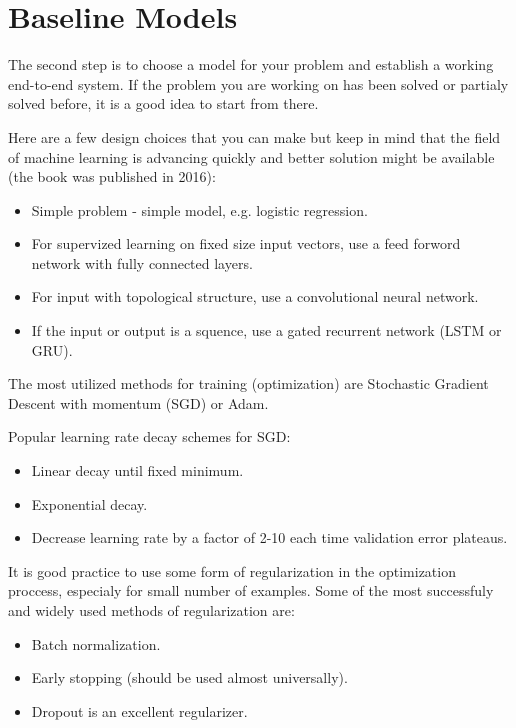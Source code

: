 \documentclass{tufte-handout}
\begin{document}
\section{Baseline Models}\label{sec:baseline-model}
The second step is to choose a model for your problem and establish a working
end-to-end system. If the problem you are working on has been solved or partialy
solved before, it is a good idea to start from there.

Here are a few design choices that you can make but keep in mind that the field of
machine learning is advancing quickly and better solution might be available
(the book was published in 2016):
\begin{itemize}
    \item Simple problem - simple model, e.g. logistic regression.
    \item For supervized learning on fixed size input vectors, use a feed forword
        network with fully connected layers.
    \item For input with topological structure, use a convolutional neural network.
    \item If the input or output is a squence, use a gated recurrent network 
        (LSTM or GRU).
\end{itemize}

The most utilized methods for training (optimization) are Stochastic Gradient
Descent with momentum (SGD) or Adam.

Popular learning rate decay schemes for SGD:
\begin{itemize}
    \item Linear decay until fixed minimum.
    \item Exponential decay.
    \item Decrease learning rate by a factor of 2-10 each time
         validation error plateaus.
\end{itemize}

It is good practice to use some form of regularization in the optimization proccess,
especialy for small number of examples.
Some of the most successfuly and widely used methods of regularization are:
\begin{itemize}
    \item Batch normalization.
    \item Early stopping (should be used almost universally\cite{goodfellow-et-al-2016}).
    \item Dropout is an excellent regularizer.
\end{itemize}
\end{document}
